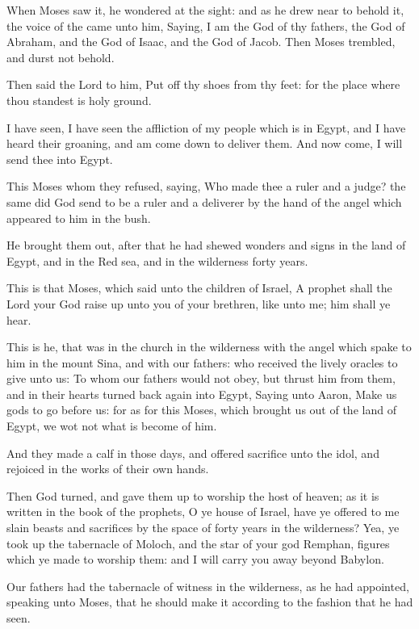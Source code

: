 \Verse When Moses saw it, he wondered at the sight: and as he drew near to behold it, the voice of the \LORD came unto him, \Verse Saying, I am the God of thy fathers, the God of Abraham, and the God of Isaac, and the God of Jacob. Then Moses trembled, and durst not behold.

\Verse Then said the Lord to him, Put off thy shoes from thy feet: for the place where thou standest is holy ground.

\Verse I have seen, I have seen the affliction of my people which is in Egypt, and I have heard their groaning, and am come down to deliver them. And now come, I will send thee into Egypt.

\Verse This Moses whom they refused, saying, Who made thee a ruler and a judge? the same did God send to be a ruler and a deliverer by the hand of the angel which appeared to him in the bush.

\Verse He brought them out, after that he had shewed wonders and signs in the land of Egypt, and in the Red sea, and in the wilderness forty years.

\Verse This is that Moses, which said unto the children of Israel, A prophet shall the Lord your God raise up unto you of your brethren, like unto me; him shall ye hear.

\Verse This is he, that was in the church in the wilderness with the angel which spake to him in the mount Sina, and with our fathers: who received the lively oracles to give unto us: \Verse To whom our fathers would not obey, but thrust him from them, and in their hearts turned back again into Egypt, \Verse Saying unto Aaron, Make us gods to go before us: for as for this Moses, which brought us out of the land of Egypt, we wot not what is become of him.

\Verse And they made a calf in those days, and offered sacrifice unto the idol, and rejoiced in the works of their own hands.

\Verse Then God turned, and gave them up to worship the host of heaven; as it is written in the book of the prophets, O ye house of Israel, have ye offered to me slain beasts and sacrifices by the space of forty years in the wilderness?  \Verse Yea, ye took up the tabernacle of Moloch, and the star of your god Remphan, figures which ye made to worship them: and I will carry you away beyond Babylon.

\Verse Our fathers had the tabernacle of witness in the wilderness, as he had appointed, speaking unto Moses, that he should make it according to the fashion that he had seen.

